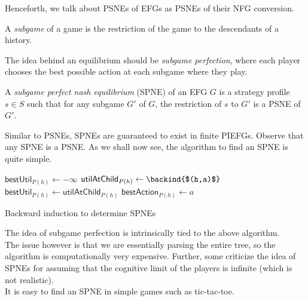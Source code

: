 	Henceforth, we talk about PSNEs of EFGs as PSNEs of their NFG conversion.

	\begin{fdef}
		A \emph{subgame} of a game is the restriction of the game to the descendants of a history.
	\end{fdef}

	The idea behind an equilibrium should be \emph{subgame perfection}, where each player chooses the best possible action at each subgame where they play.

	\begin{fdef}
		A \emph{subgame perfect nash equilibrium} (SPNE) of an EFG $G$ is a strategy profile $s \in S$ such that for any subgame $G'$ of $G$, the restriction of $s$ to $G'$ is a PSNE of $G'$.
	\end{fdef}

	Similar to PSNEs, SPNEs are guaranteed to exist in finite PIEFGs.
	Observe that any SPNE is a PSNE. As we shall now see, the algorithm to find an SPNE is quite simple.\\

	\begin{algorithm}[H]
		\DontPrintSemicolon
		\SetNoFillComment
		 { 
			 {
				\;
			}
			$\mathsf{bestUtil}_{P(h)} \gets -\infty$\;
			 {
				$\mathsf{utilAtChild}_{P(h)} \gets \backind{$(h,a)$}$\;
				 {
					$\mathsf{bestUtil}_{P(h)} \gets \mathsf{utilAtChild}_{P(h)}$\;
					$\mathsf{bestAction}_{P(h)} \gets a$\;
				}
			}
		}
		\caption{Backward induction to determine SPNEs}
	\end{algorithm}

	The idea of subgame perfection is intrinsically tied to the above algorithm.\\
	The issue however is that we are essentially parsing the entire tree, so the algorithm is computationally very expensive. Further, some criticize the idea of SPNEs for assuming that the cognitive limit of the players is infinite (which is not realistic).\\
	It is easy to find an SPNE in simple games such as tic-tac-toe.\\


